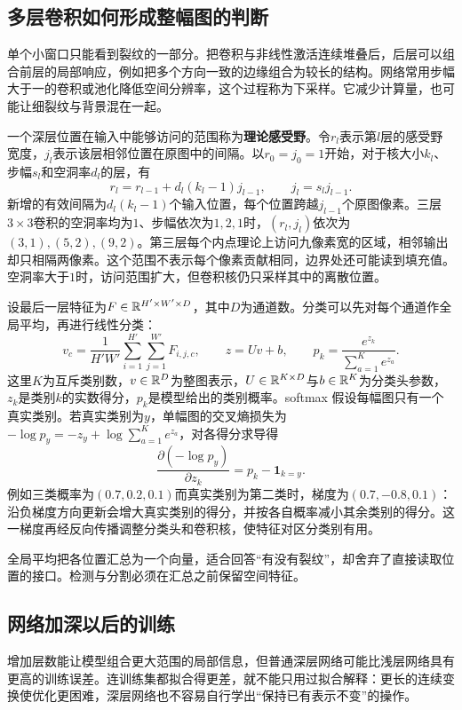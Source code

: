 \subsection{多层卷积如何形成整幅图的判断}
单个小窗口只能看到裂纹的一部分。把卷积与非线性激活连续堆叠后，后层可以组合前层的局部响应，例如把多个方向一致的边缘组合为较长的结构。网络常用步幅大于一的卷积或池化降低空间分辨率，这个过程称为下采样。它减少计算量，也可能让细裂纹与背景混在一起。

一个深层位置在输入中能够访问的范围称为\textbf{理论感受野}。令$r_l$表示第$l$层的感受野宽度，$j_l$表示该层相邻位置在原图中的间隔。以$r_0=j_0=1$开始，对于核大小$k_l$、步幅$s_l$和空洞率$d_l$的层，有
\begin{equation}
 r_l=r_{l-1}+d_l(k_l-1)j_{l-1},\qquad j_l=s_lj_{l-1}.
 \label{eq:vision-receptive-field}
\end{equation}
新增的有效间隔为$d_l(k_l-1)$个输入位置，每个位置跨越$j_{l-1}$个原图像素。三层$3\times3$卷积的空洞率均为$1$、步幅依次为$1,2,1$时，$(r_l,j_l)$依次为$(3,1),(5,2),(9,2)$。第三层每个内点理论上访问九像素宽的区域，相邻输出却只相隔两像素。这个范围不表示每个像素贡献相同，边界处还可能读到填充值。空洞率大于$1$时，访问范围扩大，但卷积核仍只采样其中的离散位置。

设最后一层特征为$F\in\mathbb{R}^{H'\times W'\times D}$，其中$D$为通道数。分类可以先对每个通道作全局平均，再进行线性分类：
\begin{equation}
 v_c=\frac{1}{H'W'}\sum_{i=1}^{H'}\sum_{j=1}^{W'}F_{i,j,c},\qquad
 z=Uv+b,\qquad p_k=\frac{e^{z_k}}{\sum_{a=1}^{K}e^{z_a}}.
 \label{eq:vision-classification}
\end{equation}
这里$K$为互斥类别数，$v\in\mathbb{R}^D$为整图表示，$U\in\mathbb{R}^{K\times D}$与$b\in\mathbb{R}^K$为分类头参数，$z_k$是类别$k$的实数得分，$p_k$是模型给出的类别概率。softmax 假设每幅图只有一个真实类别。若真实类别为$y$，单幅图的交叉熵损失为$-\log p_y=-z_y+\log\sum_{a=1}^K e^{z_a}$，对各得分求导得
\[
 \frac{\partial(-\log p_y)}{\partial z_k}=p_k-\mathbf1_{k=y}.
\]
例如三类概率为$(0.7,0.2,0.1)$而真实类别为第二类时，梯度为$(0.7,-0.8,0.1)$：沿负梯度方向更新会增大真实类别的得分，并按各自概率减小其余类别的得分。这一梯度再经反向传播调整分类头和卷积核，使特征对区分类别有用。

全局平均把各位置汇总为一个向量，适合回答“有没有裂纹”，却舍弃了直接读取位置的接口。检测与分割必须在汇总之前保留空间特征。

\subsection{网络加深以后的训练}
增加层数能让模型组合更大范围的局部信息，但普通深层网络可能比浅层网络具有更高的训练误差。连训练集都拟合得更差，就不能只用过拟合解释：更长的连续变换使优化更困难，深层网络也不容易自行学出“保持已有表示不变”的操作。


